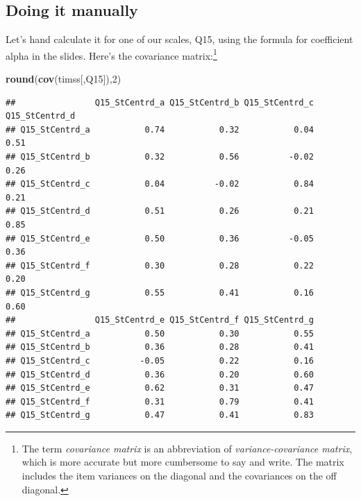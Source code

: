 \documentclass[
]{article}
\newenvironment{Shaded}{\begin{snugshade}}{\end{snugshade}}
\newcommand{\DecValTok}[1]{\textcolor[rgb]{0.00,0.00,0.81}{#1}}
\newcommand{\KeywordTok}[1]{\textcolor[rgb]{0.13,0.29,0.53}{\textbf{#1}}}
\newcommand{\NormalTok}[1]{#1}
\begin{document}
\hypertarget{doing-it-manually}{%
\subsection{Doing it manually}\label{doing-it-manually}}

Let's hand calculate it for one of our scales, Q15, using the formula for coefficient alpha in the slides. Here's the covariance matrix:\footnote{The term \emph{covariance matrix} is an abbreviation of \emph{variance-covariance matrix}, which is more accurate but more cumbersome to say and write. The matrix includes the item variances on the diagonal and the covariances on the off diagonal.}

\begin{Shaded}
\begin{Highlighting}[]
\KeywordTok{round}\NormalTok{(}\KeywordTok{cov}\NormalTok{(timss[,Q15]),}\DecValTok{2}\NormalTok{)}
\end{Highlighting}
\end{Shaded}

\begin{verbatim}
##                Q15_StCentrd_a Q15_StCentrd_b Q15_StCentrd_c Q15_StCentrd_d
## Q15_StCentrd_a           0.74           0.32           0.04           0.51
## Q15_StCentrd_b           0.32           0.56          -0.02           0.26
## Q15_StCentrd_c           0.04          -0.02           0.84           0.21
## Q15_StCentrd_d           0.51           0.26           0.21           0.85
## Q15_StCentrd_e           0.50           0.36          -0.05           0.36
## Q15_StCentrd_f           0.30           0.28           0.22           0.20
## Q15_StCentrd_g           0.55           0.41           0.16           0.60
##                Q15_StCentrd_e Q15_StCentrd_f Q15_StCentrd_g
## Q15_StCentrd_a           0.50           0.30           0.55
## Q15_StCentrd_b           0.36           0.28           0.41
## Q15_StCentrd_c          -0.05           0.22           0.16
## Q15_StCentrd_d           0.36           0.20           0.60
## Q15_StCentrd_e           0.62           0.31           0.47
## Q15_StCentrd_f           0.31           0.79           0.41
## Q15_StCentrd_g           0.47           0.41           0.83
\end{verbatim}
\end{document}
